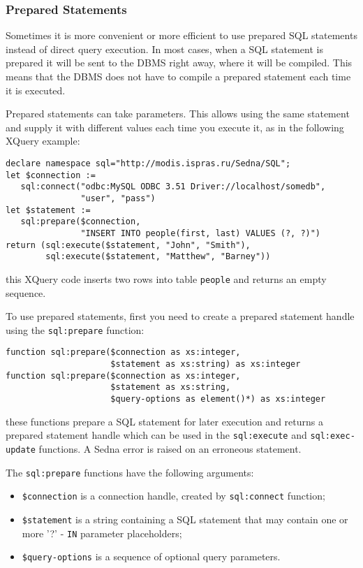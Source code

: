 \documentclass[a4paper,12pt]{article}
\newenvironment{citemize}
{\begin{itemize}
  \setlength{\itemsep}{0pt}
  \setlength{\parskip}{0pt}
  \setlength{\parsep}{0pt}}
{\end{itemize}}
\begin{document}
\subsubsection*{Prepared Statements}
Sometimes it is more convenient or more efficient to use prepared SQL statements
instead of direct query execution. In most cases, when a SQL statement is
prepared it will be sent to the DBMS right away, where it will be compiled. This
means that the DBMS does not have to compile a prepared statement each time it
is executed.

Prepared statements can take parameters. This allows using the same statement
and supply it with different values each time you execute it, as in the
following XQuery example:
\small{
\begin{verbatim}
declare namespace sql="http://modis.ispras.ru/Sedna/SQL";
let $connection :=
   sql:connect("odbc:MySQL ODBC 3.51 Driver://localhost/somedb",
               "user", "pass")
let $statement :=
   sql:prepare($connection,
               "INSERT INTO people(first, last) VALUES (?, ?)")
return (sql:execute($statement, "John", "Smith"),
        sql:execute($statement, "Matthew", "Barney"))
\end{verbatim}}
\noindent
this XQuery code inserts two rows into table \verb!people! and returns an empty
sequence.

To use prepared statements, first you need to create a prepared statement handle
using the \verb!sql:prepare! function:
\small{
\begin{verbatim}
function sql:prepare($connection as xs:integer,
                     $statement as xs:string) as xs:integer
function sql:prepare($connection as xs:integer,
                     $statement as xs:string,
                     $query-options as element()*) as xs:integer
\end{verbatim}}
\noindent
these functions prepare a SQL statement for later execution and returns a
prepared statement handle which can be used in the \verb!sql:execute! and
\verb!sql:exec-update! functions. A Sedna error is raised on an erroneous
statement.

The \verb!sql:prepare! functions have the following arguments:

\begin{citemize}
\item \verb!$connection! is a connection handle, created by \verb!sql:connect!
function;
\item \verb!$statement! is a string containing a SQL statement that may
contain one or more '?' - \verb!IN! parameter placeholders;
\item \verb!$query-options! is a sequence of optional query parameters.
\end{citemize}
\end{document}
